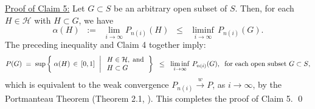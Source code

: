 \vskip 0.5cm
\noindent
\underline{Proof of Claim 5:}\quad
Let $G \subset S$ be an arbitrary open subset of $S$.
Then, for each $H \in \mathcal{H}$ with $H \subset G$, we have
\begin{equation*}
\alpha(H)
\;\; := \;\; \lim_{i\rightarrow\infty}P_{n(i)}(H)
\;\; \leq \;\; \liminf_{i\rightarrow\infty}\,P_{n(i)}(G).
\end{equation*}
The preceding inequality and Claim 4 together imply:
\begin{equation*}
P(G)
\; = \;
\sup\left\{\;
\alpha(H) \,\in\, [0,1]
\,\;\left\vert\;
\begin{array}{l} H \in \mathcal{H}, \;\textnormal{and} \\ H \subset G \end{array}
\right.
\right\}
\;\;\leq\;\;
\liminf_{i\rightarrow\infty}\,P_{n(i)}(G),
\;\;
\textnormal{for each open subset $G \subset S$},
\end{equation*}
which is equivalent to the weak convergence
$P_{n(i)} \overset{w}{\longrightarrow} P$, as $i \longrightarrow \infty$,
by the Portmanteau Theorem (Theorem 2.1, \cite{Billingsley1999}).
This completes the proof of Claim 5.
\qed
